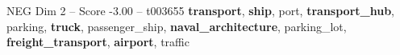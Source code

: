 \begin{textsample}{NEG Dim 2 – Score -3.00 – t003655}  \label{ex:f2_neg_032}
\textbf{transport}, \textbf{ship}, port, \textbf{transport\_hub}, parking, \textbf{truck}, passenger\_ship, \textbf{naval\_architecture}, parking\_lot, \textbf{freight\_transport}, \textbf{airport}, traffic

\end{textsample}
